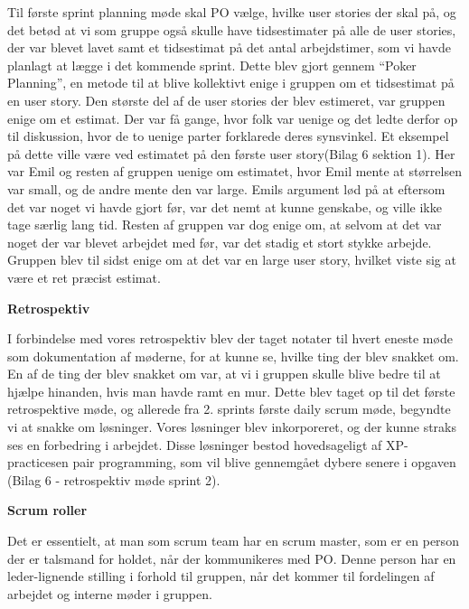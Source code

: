 \documentclass[11pt]{report}
\begin{document}
Til første sprint planning møde skal PO vælge, hvilke user stories der skal på, og det betød at vi som gruppe også skulle have tidsestimater på alle de user stories, der var blevet lavet samt et tidsestimat på det antal arbejdstimer, som vi havde planlagt at lægge i det kommende sprint. Dette blev gjort gennem “Poker Planning”, en metode til at blive kollektivt enige i gruppen om et tidsestimat på en user story. Den største del af de user stories der blev estimeret, var gruppen enige om et estimat. Der var få gange, hvor folk var uenige og det ledte derfor op til diskussion, hvor de to uenige parter forklarede deres synsvinkel. Et eksempel på dette ville være ved estimatet på den første user story(Bilag 6 sektion 1). Her var Emil og resten af gruppen uenige om estimatet, hvor Emil mente at størrelsen var small, og de andre mente den var large. Emils argument lød på at eftersom det var noget vi havde gjort før, var det nemt at kunne genskabe, og ville ikke tage særlig lang tid. Resten af gruppen var dog enige om, at selvom at det var noget der var blevet arbejdet med før, var det stadig et stort stykke arbejde. Gruppen blev til sidst enige om at det var en large user story, hvilket viste sig at være et ret præcist estimat.

\newpage
\noindent\textbf{Retrospektiv}
\par I forbindelse med vores retrospektiv blev der taget notater til hvert eneste møde som dokumentation af møderne, for at kunne se, hvilke ting der blev snakket om. En af de ting der blev snakket om var, at vi i gruppen skulle blive bedre til at hjælpe hinanden, hvis man havde ramt en mur. Dette blev taget op til det første retrospektive møde, og allerede fra 2. sprints første daily scrum møde, begyndte vi at snakke om løsninger. Vores løsninger blev inkorporeret, og der kunne straks ses en forbedring i arbejdet. Disse løsninger bestod hovedsageligt af XP-practicesen pair programming, som vil blive gennemgået dybere senere i opgaven (Bilag 6 - retrospektiv møde sprint 2).

\noindent\textbf{Scrum roller}
\par Det er essentielt, at man som scrum team har en scrum master, som er en person der er talsmand for holdet, når der kommunikeres med PO. Denne person har en leder-lignende stilling i forhold til gruppen, når det kommer til fordelingen af arbejdet og interne møder i gruppen.
\end{document}

